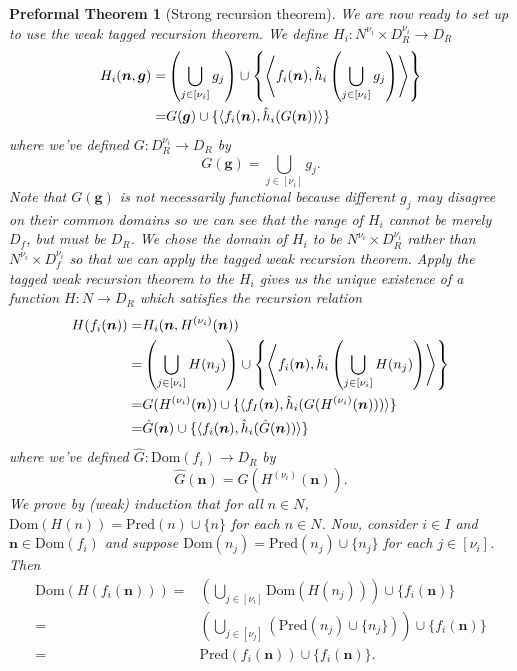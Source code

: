 \documentclass[oneside, 12pt]{book}
\theoremstyle{break}
\newtheorem{preformal definition}[definition]{Preformal Definition}
\newtheorem{preformal theorem}[theorem]{Preformal Theorem}
\newcommand{\bv}[1]{\boldsymbol{#1}}
\begin{document}
\begin{preformal theorem}[Strong recursion theorem]
				We are now ready to set up to use the weak tagged recursion theorem.
				We define $H_i: N^{\nu_i} \times D_R^{\nu_i} \to D_R$
				\begin{align*}
					H_i(\bv{n}, \bv{g}) =& \left(\bigcup_{j\in [\nu_i]} g_j\right) \cup \left\{\Braket{f_i(\bv{n}), \hat{h}_i\left( \bigcup_{j\in [\nu_i]} g_j\right)}\right\}\\
					=& G(\bv{g}) \cup \{\braket{f_i(\bv{n}), \hat{h}_i(G(\bv{n}))}\}
				\end{align*}
				where we've defined $G: D_R^{\nu_i} \to D_R$ by
				\begin{equation*}
					G(\bv{g}) = \bigcup_{j\in [\nu_i]} g_j.
				\end{equation*}
				Note that $G(\bv{g})$ is not necessarily functional because different $g_j$ may disagree on their common domains so we can see that the range of $H_i$ cannot be merely $D_f$, but must be $D_R$.
				We chose the domain of $H_i$ to be $N^{\nu_i}\times D_R^{\nu_i}$ rather than $N^{\nu_i} \times D_f^{\nu_i}$ so that we can apply the tagged weak recursion theorem.
				Apply the tagged weak recursion theorem to the $H_i$ gives us the unique existence of a function $H:N \to D_R$ which satisfies the recursion relation
				\begin{align*}
					H(f_i(\bv{n})) =& H_i(\bv{n}, H^{(\nu_i)}(\bv{n}))\\
					=& \left(\bigcup_{j\in [\nu_i]}H(n_j)\right) \cup \left\{\Braket{f_i(\bv{n}), \hat{h}_i\left(\bigcup_{j\in [\nu_i]} H(n_j)\right)}\right\}\\
					=& G(H^{(\nu_i)}(\bv{n})) \cup \{\braket{f_I(\bv{n}), \hat{h}_i(G(H^{(\nu_i)}(\bv{n})))}\}\\
					=& \hat{G}(\bv{n}) \cup \{\braket{f_i(\bv{n}), \hat{h}_i(\hat{G}(\bv{n}))}\}
				\end{align*}
				where we've defined $\hat{G}: \text{Dom}(f_i) \to D_R$ by
				\begin{equation*}
					\hat{G}(\bv{n}) = G(H^{(\nu_i)}(\bv{n})).
				\end{equation*}
				We prove by (weak) induction that for all $n\in N$, $\text{Dom}(H(n)) = \text{Pred}(n) \cup \{n\}$ for each $n\in N$.
				Now, consider $i\in I$ and $\bv{n} \in \text{Dom}(f_i)$ and suppose $\text{Dom}(n_j) = \text{Pred}(n_j) \cup \{n_j\}$ for each $j\in [\nu_i]$.
				Then
				\begin{align*}
					\text{Dom}(H(f_i(\bv{n}))) =& \left(\bigcup_{j\in [\nu_i]} \text{Dom}(H(n_j))\right) \cup \{f_i(\bv{n})\}\\
					=& \left(\bigcup_{j\in [\nu_j]} \left(\text{Pred}(n_j) \cup \{n_j\}\right)\right) \cup \{f_i(\bv{n})\}\\
					=& \text{Pred}(f_i(\bv{n})) \cup \{f_i(\bv{n})\}.
				\end{align*}
				

\end{preformal theorem}
\end{document}
